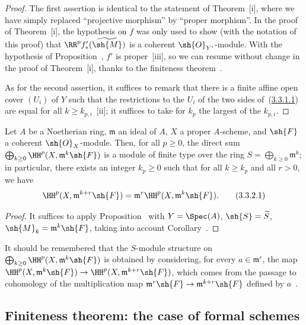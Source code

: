 \begin{proof}
The first assertion is identical to the statement of Theorem~[i], where we have simply replaced ``projective morphism'' by ``proper morphism''.
In the proof of Theorem~[i], the hypothesis on $f$ was only used to show (with the notation of this proof) that $\RR^p f_*'(\widetilde{\sh{M}})$ is a coherent $\sh{O}_{Y'}$-module.
With the hypothesis of Proposition~, $f'$ is proper~[iii], so we can resume without change in the proof of Theorem~[i], thanks to the finiteness theorem~.

As for the second assertion, it suffices to remark that there is a finite affine open cover $(U_i)$ of $Y$ such that the restrictions to the $U_i$ of the two sides of~(\hyperref[III.3.3.1.1]{3.3.1.1}) are equal for all $k\geq k_{p,i}$~[ii]; it suffices to take for $k_p$ the largest of the $k_{p,i}$.
\end{proof}

\begin{corollary}[3.3.2]
\label{III.3.3.2}
Let $A$ be a Noetherian ring, $\mathfrak{m}$ an ideal of $A$, $X$ a proper $A$-scheme, and $\sh{F}$ a coherent $\sh{O}_X$-module.
Then, for all $p\geq 0$, the direct sum $\bigoplus_{k\geq 0}\HH^p(X,\mathfrak{m}^k\sh{F})$ is a module of finite type over the ring $S=\bigoplus_{k\geq 0}\mathfrak{m}^k$; in particular, there exists an integer $k_p\geq 0$ such that for all $k\geq k_p$ and all $r>0$, we have
\[
\label{III.3.3.2.1}
  \HH^p(X,\mathfrak{m}^{k+r}\sh{F})=\mathfrak{m}^r\HH^p(X,\mathfrak{m}^k\sh{F}).
  \tag{3.3.2.1}
\]
\end{corollary}

\begin{proof}
It suffices to apply Proposition~ with $Y=\Spec(A)$, $\sh{S}=\widetilde{S}$, $\sh{M}_k=\mathfrak{m}^k\sh{F}$, taking into account Corollary~.
\end{proof}

It should be remembered that the $S$-module structure on $\bigoplus_{k\geq 0}\HH^p(X,\mathfrak{m}^k\sh{F})$ is obtained by considering, for every $a\in\mathfrak{m}^r$, the map $\HH^p(X,\mathfrak{m}^k\sh{F})\to\HH^p(X,\mathfrak{m}^{k+r}\sh{F})$, which comes from the passage to cohomology of the multiplication map $\mathfrak{m}^r\sh{F}\to\mathfrak{m}^{k+r}\sh{F}$ defined by $a$~.

\subsection{Finiteness theorem: the case of formal schemes}
\label{subsection:III.3.4}

